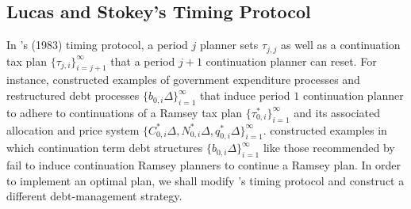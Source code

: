 \documentclass[12pt]{article}
\newcommand{\NW}[1]{{\textcolor{blue}{#1}}}
\newcommand{\WJ}[1]{{\textcolor{red}{#1}}}
\newcommand{\TS}[1]{{\textcolor{magenta}{#1}}}
\begin{document}
	\subsection{Lucas and Stokey's Timing Protocol}
	{In \citeauthor{LucasStokey1983}'s (1983) timing protocol, a  period $j$ planner  sets  {$\tau_{j, j}$} as well as 
		a continuation tax plan  {$   \{\tau_{j, i}\}_{i=j+ 1}^{\infty} $} that a  period $j+1$ continuation planner {can} reset.  %
		For instance, \citet{LucasStokey1983}  constructed examples of government expenditure processes and restructured debt  processes $\{ b_{0, i}\Delta \}_{i=1}^\infty$ that induce period $1$ continuation planner to adhere to continuations of  a Ramsey tax plan $\{\tau_{0, i}^\ast\}_{i= 1}^\infty$ and its associated allocation and price system $\{C_{0, i}^\ast\Delta, N_{0, i}^\ast\Delta, q_{0, i}^\ast \Delta\}_  {i= 1}^\infty$. 
		\citet*{debortoli2021optimal} constructed examples  in which   continuation term debt   structures  $\{ b_{0, i}\Delta \}_{i=1}^\infty$ like those   recommended by     \citet{LucasStokey1983} fail to  induce  continuation Ramsey planners to  continue  a Ramsey  plan.} In order to implement  an optimal  plan, we shall modify  \citeauthor{LucasStokey1983}'s
	timing protocol and construct a different  debt-management strategy. %
	
	
	
	
	
\end{document}
